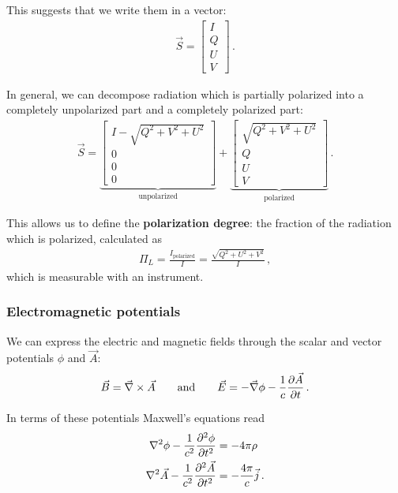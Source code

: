 \documentclass[main.tex]{subfiles}
\begin{document}
This suggests that we write them in a vector: 
%
\begin{align}
\vec{S} = \left[\begin{array}{c}
I \\ 
Q \\ 
U \\ 
V
\end{array}\right]
\,.
\end{align}

In general, we can decompose radiation which is partially polarized into a completely unpolarized part and a completely polarized part: 
%
\begin{align}
\vec{S} = \underbrace{\left[\begin{array}{c}
I - \sqrt{Q^2+V^2+U^2} \\ 
0 \\ 
0 \\ 
0
\end{array}\right]}_{\text{unpolarized}}
+ 
\underbrace{\left[\begin{array}{c}
\sqrt{Q^2+V^2+U^2} \\ 
Q \\ 
U \\ 
V
\end{array}\right]}_{\text{polarized}}
\,.
\end{align}

This allows us to define the \textbf{polarization degree}: the fraction of the radiation which is polarized, calculated as 
%
\begin{align}
\Pi_{L} = \frac{I _{\text{polarized}}}{I} = \frac{\sqrt{Q^2+U^2+V^2}}{I}
\,,
\end{align}
%
which is measurable with an instrument.

\subsubsection{Electromagnetic potentials}

We can express the electric and magnetic fields through the scalar and vector potentials \(\phi \) and \(\vec{A}\): 
%
\begin{align}
\vec{B} = \vec{\nabla} \times \vec{A} 
\qquad \text{and} \qquad
\vec{E} = - \vec{\nabla} \phi - \frac{1}{c} \pdv{\vec{A}}{t}
\,.
\end{align}

In terms of these potentials Maxwell's equations read 
%
\begin{align}
\nabla^2 \phi - \frac{1}{c^2} \pdv[2]{\phi }{t} &= - 4 \pi \rho \\
\nabla^2 \vec{A} - \frac{1}{c^2} \pdv[2]{\vec{A}}{t} &= - \frac{4 \pi }{c} \vec{j} 
\,.
\end{align}
\end{document}
